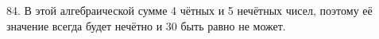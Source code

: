 84. В этой алгебраической сумме 4 чётных и 5 нечётных чисел, поэтому её значение всегда будет нечётно и 30 быть равно не может.\\
